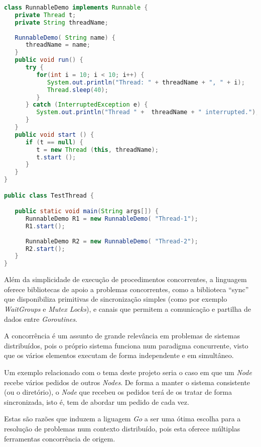 
\begin{lstlisting}[caption={Exemplo em \emph{Java}, usando a \emph{interface} ``Runnable'' e uma classe``RunnableDemo'' para começar \emph{threads}.},language=Java]
class RunnableDemo implements Runnable {
   private Thread t;
   private String threadName;
   
   RunnableDemo( String name) {
      threadName = name;
   }
   public void run() {
      try {
         for(int i = 10; i < 10; i++) {
            System.out.println("Thread: " + threadName + ", " + i);
            Thread.sleep(40);
         }
      } catch (InterruptedException e) {
         System.out.println("Thread " +  threadName + " interrupted.");
      }
   }
   public void start () {
      if (t == null) {
         t = new Thread (this, threadName);
         t.start ();
      }
   }
}

public class TestThread {

   public static void main(String args[]) {
      RunnableDemo R1 = new RunnableDemo( "Thread-1");
      R1.start();
      
      RunnableDemo R2 = new RunnableDemo( "Thread-2");
      R2.start();
   }   
}

\end{lstlisting}

Além da simplicidade de execução de procedimentos concorrentes, a linguagem oferece bibliotecas de apoio a problemas concorrentes, como a biblioteca ``sync'' que disponibiliza primitivas de sincronização simples (como por exemplo \emph{WaitGroups} e \emph{Mutex Locks}), e canais que permitem a comunicação e partilha de dados entre \emph{Goroutines}.



A concorrência é um assunto de grande relevância em problemas de sistemas distribuídos, pois o próprio sistema funciona num paradigma concurrente, visto que os vários elementos executam de forma independente e em simultâneo.

Um exemplo relacionado com o tema deste projeto seria o caso em que um \emph{Node} recebe vários pedidos de outros \emph{Nodes}. De forma a manter o sistema consistente (ou o diretório), o \emph{Node} que recebeu os pedidos terá de os tratar de forma sincronizada, isto é, tem de abordar um pedido de cada vez.

Estas são razões que induzem a liguagem \emph{Go} a ser uma ótima escolha para a resolução de problemas num contexto distribuído, pois esta oferece múltiplas ferramentas concorrência de origem.

